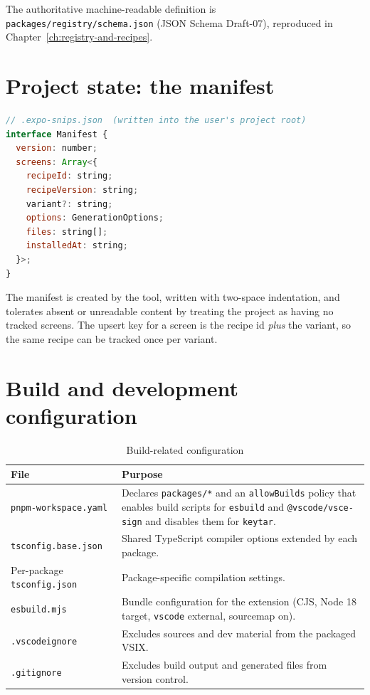 The authoritative machine-readable definition is
\texttt{packages/registry/schema.json} (JSON Schema Draft-07), reproduced in
Chapter~\ref{ch:registry-and-recipes}.

\section{Project state: the manifest}

\begin{lstlisting}[language=JavaScript]
// .expo-snips.json  (written into the user's project root)
interface Manifest {
  version: number;
  screens: Array<{
    recipeId: string;
    recipeVersion: string;
    variant?: string;
    options: GenerationOptions;
    files: string[];
    installedAt: string;
  }>;
}
\end{lstlisting}

The manifest is created by the tool, written with two-space indentation, and
tolerates absent or unreadable content by treating the project as having no
tracked screens. The upsert key for a screen is the recipe id \emph{plus} the
variant, so the same recipe can be tracked once per variant.

\section{Build and development configuration}

\begin{longtable}{p{4.4cm}p{9.8cm}}
\caption{Build-related configuration}\\
\toprule
\textbf{File} & \textbf{Purpose} \\
\midrule

\texttt{pnpm-workspace.yaml} & Declares \texttt{packages/*} and an
\texttt{allowBuilds} policy that enables build scripts for \texttt{esbuild} and
\texttt{@vscode/vsce-sign} and disables them for \texttt{keytar}. \\
\texttt{tsconfig.base.json} & Shared TypeScript compiler options extended by each
package. \\
Per-package \texttt{tsconfig.json} & Package-specific compilation settings. \\
\texttt{esbuild.mjs} & Bundle configuration for the extension (CJS, Node 18
target, \texttt{vscode} external, sourcemap on). \\
\texttt{.vscodeignore} & Excludes sources and dev material from the packaged
VSIX. \\
\texttt{.gitignore} & Excludes build output and generated files from version
control. \\
\bottomrule
\end{longtable}

